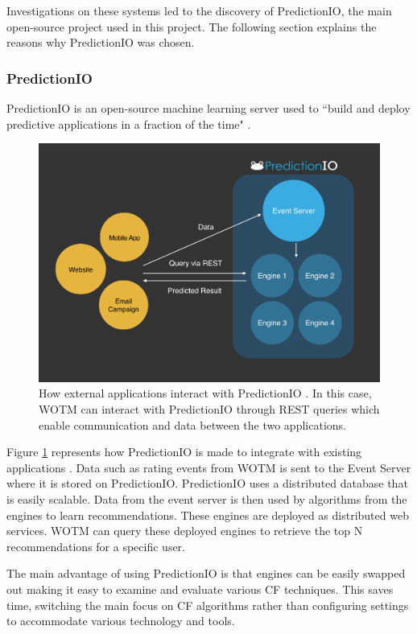 Investigations on these systems led to the discovery of PredictionIO, the main open-source project used in this project. The following section explains the reasons why PredictionIO was chosen. 

\subsubsection{PredictionIO}

PredictionIO is an open-source machine learning server used to ``build and deploy predictive applications in a fraction of the time" \cite{predictionio, predictionio2}.

\begin{figure}
\centering
\includegraphics[scale=0.35]{images/predictionIO}
\caption{ How external applications interact with PredictionIO \cite{predictionio}. In this case, WOTM can interact with PredictionIO through REST queries which enable communication and data between the two applications.}
\label{fig:predictionIO}
\end{figure}


Figure \ref{fig:predictionIO} represents how PredictionIO is made to integrate with existing applications \cite{predictionio}. Data such as rating events from WOTM is sent to the Event Server where it is stored on PredictionIO. PredictionIO uses a distributed database that is easily scalable. Data from the event server is then used by algorithms from the engines to learn recommendations. These engines are deployed as distributed web services. WOTM can query these deployed engines to retrieve the top N recommendations for a specific user. 

The main advantage of using PredictionIO is that engines can be easily swapped out making it easy to examine and evaluate various CF techniques. This saves time, switching the main focus on CF algorithms rather than configuring settings to accommodate various technology and tools.

